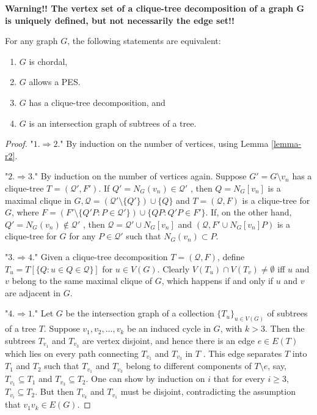 \textbf{Warning!! The vertex set of a clique-tree decomposition of a graph G is uniquely defined, but not necessarily the edge set!!}

\begin{thm}
	For any graph $G$, the following statements are equivalent:
	
	\begin{enumerate}
		\item $G$ is chordal,
		\item $G$ allows a PES.
		\item $G$ has a clique-tree decomposition, and
		\item $G$ is an intersection graph of subtrees of a tree.
	\end{enumerate}
\end{thm}

\begin{proof}
	"$1. \Rightarrow 2.$" By induction on the number of vertices, using Lemma \ref{lemma-r2}.
	
	"$2. \Rightarrow 3.$" By induction on the number of vertices again. Suppose $G' = G \setminus v_n$ has a clique-tree	$T = (\mathcal{Q}' , F')$. If $Q' = N_G (v_n) \in \mathcal{Q}'$ , then $Q = N_G [v_n]$ is a maximal clique in $G, \mathcal{Q} = (\mathcal{Q}' \setminus \{Q'\}) \cup \{Q\}$ and $T = (\mathcal{Q}, F)$ is a clique-tree for $G$, where $F = (F' \setminus \{Q' P : P \in \mathcal{Q}'\}) \cup \{QP : Q'P \in F'\}$. If, on the other hand, $Q' = N_G(v_n) \notin \mathcal{Q}'$ , then $\mathcal{Q} = \mathcal{Q}' \cup N_G [v_n]$ and $(\mathcal{Q}, F' \cup N_G [v_n]P)$ is a clique-tree for $G$ for any $P \in \mathcal{Q}'$ such that $N_G (v_n) \subset P$.
	
	"$3. \Rightarrow 4.$" Given a clique-tree decomposition $T = (\mathcal{Q}, F)$, define $T_u = T [\{Q : u \in Q \in \mathcal{Q}\}]$ for $u \in V(G)$. Clearly $V(T_u) \cap V(T_v) \neq \emptyset$ iff $u$ and $v$ belong to the same maximal clique of $G$, which happens if and only if $u$ and $v$ are adjacent in $G$.
	
	"$4. \Rightarrow 1.$" Let $G$ be the intersection graph of a collection $\{T_u\}_{u \in V(G)}$ of subtrees of a tree $T$. Suppose $v_1, v_2, \dots, v_k$ be an induced cycle in $G$, with $k > 3$. Then the subtrees $T_{v_1}$ and $T_{v_3}$ are vertex disjoint, and hence there is an edge $e \in E(T)$ which lies on every path connecting $T_{v_1}$ and $T_{v_3}$ in $T$ . This edge separates $T$ into $T_1$ and $T_2$ such that $T_{v_1}$ and $T_{v_3}$ belong to different components of $T \setminus e$, say, $T_{v_1} \subseteq T_1$ and $T_{v_3} \subseteq T_2$. One can show by induction on $i$ that for every $i \geq 3$, $T_{v_i} \subseteq T_2$. But then $T_{v_k}$ and $T_{v_1}$ must be disjoint, contradicting the assumption that $v_1 v_k \in E(G)$.
\end{proof}

